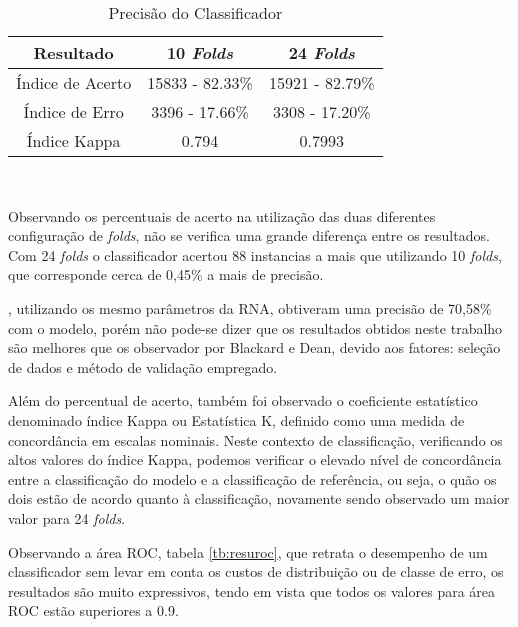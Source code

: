 \begin{table}[!h]
\caption{ Precisão do Classificador }
\label{tb:resulcla}
\centering
\setlength{\tabcolsep}{5pt}
\begin{tabular}{ccc}
\hline
Resultado &10 \textit{Folds} &24 \textit{Folds} \\
\hline
Índice de Acerto &15833 - 82.33\% &15921 - 82.79\% \\
\hline
Índice de Erro &3396 - 17.66\% &3308 - 17.20\% \\
\hline
Índice Kappa &0.794 &0.7993 \\
\hline
\end{tabular}
\\
\singlespacing
{}
\end{table}

Observando os percentuais de acerto na utilização das duas diferentes configuração de \textit{folds}, não se verifica uma grande diferença entre os resultados. Com 24 \textit{folds} o classificador acertou 88 instancias a mais que utilizando 10 \textit{folds}, que corresponde cerca de 0,45\% a mais de precisão.

, utilizando os mesmo parâmetros da RNA, obtiveram uma precisão de 70,58\% com o modelo, porém não pode-se dizer que os resultados obtidos neste trabalho são melhores que os observador por Blackard e Dean, devido aos fatores: seleção de dados e método de validação empregado.

Além do percentual de acerto, também foi observado o coeficiente estatístico denominado índice Kappa ou Estatística K, definido como uma medida de concordância em escalas nominais. Neste contexto de classificação, verificando os altos valores do índice Kappa, podemos verificar o elevado nível de concordância entre a classificação do modelo e a classificação de referência, ou seja, o quão os dois estão de acordo quanto à classificação, novamente sendo observado um maior valor para 24 \textit{folds}.

Observando a área ROC, tabela \ref{tb:resuroc}, que retrata o desempenho de um classificador sem levar em conta os custos de distribuição ou de classe de erro, os resultados são muito expressivos, tendo em vista que todos os valores para área ROC estão superiores a 0.9.

